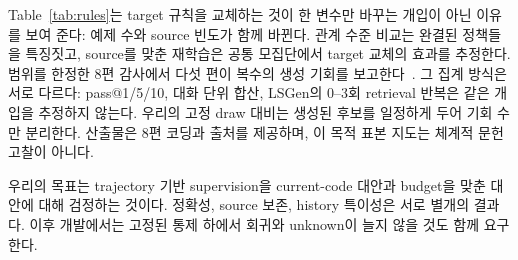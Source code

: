 \documentclass[10pt,conference]{IEEEtran}
\begin{document}
Table~\ref{tab:rules}는 target 규칙을 교체하는 것이 한 변수만 바꾸는 개입이 아닌 이유를 보여 준다: 예제 수와 source 빈도가 함께 바뀐다. 관계 수준 비교는 완결된 정책들을 특징짓고, source를 맞춘 재학습은 공통 모집단에서 target 교체의 효과를 추정한다. 범위를 한정한 8편 감사에서 다섯 편이 복수의 생성 기회를 보고한다~\cite{zhang2024pydex,koutcheme2024benchmarking,yang2024cref,orvalho2025counterexample,dai2026learner}. 그 집계 방식은 서로 다르다: pass@1/5/10, 대화 단위 합산, LSGen의 0--3회 retrieval 반복은 같은 개입을 추정하지 않는다. 우리의 고정 draw 대비는 생성된 후보를 일정하게 두어 기회 수만 분리한다. 산출물은 8편 코딩과 출처를 제공하며, 이 목적 표본 지도는 체계적 문헌고찰이 아니다.

우리의 목표는 trajectory 기반 supervision을 current-code 대안과 budget을 맞춘 대안에 대해 검정하는 것이다. 정확성, source 보존, history 특이성은 서로 별개의 결과다. 이후 개발에서는 고정된 통제 하에서 회귀와 unknown이 늘지 않을 것도 함께 요구한다.
\end{document}
